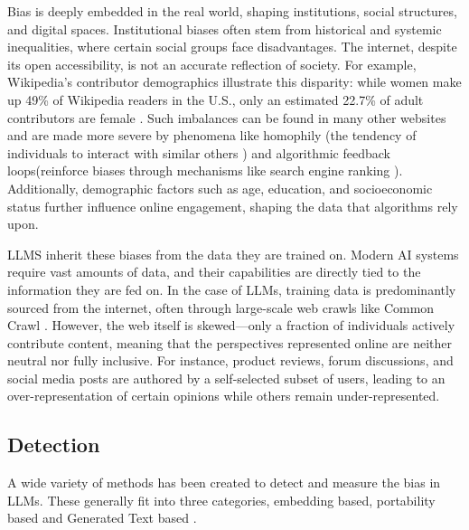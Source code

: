 Bias is deeply embedded in the real world, shaping institutions, social structures, and digital spaces. Institutional biases often stem from historical and systemic inequalities, where certain social groups face disadvantages. The internet, despite its open accessibility, is not an accurate reflection of society. For example, Wikipedia's contributor demographics illustrate this disparity: while women make up 49\% of Wikipedia readers in the U.S., only an estimated 22.7\% of adult contributors are female \citep{hill2013wikipedia}. Such imbalances can be found in many other websites and are made more severe by phenomena like homophily (the tendency of individuals to interact with similar others \citep{karimi2018homophily}) and algorithmic feedback loops(reinforce biases through mechanisms like search engine ranking \citep{lerman2014leveraging}). Additionally, demographic factors such as age, education, and socioeconomic status further influence online engagement, shaping the data that algorithms rely upon.

LLMS inherit these biases from the data they are trained on. Modern AI systems require vast amounts of data, and their capabilities are directly tied to the information they are fed on. In the case of LLMs, training data is predominantly sourced from the internet, often through large-scale web crawls like Common Crawl \citep{brown2020language}. However, the web itself is skewed—only a fraction of individuals actively contribute content, meaning that the perspectives represented online are neither neutral nor fully inclusive. For instance, product reviews, forum discussions, and social media posts are authored by a self-selected subset of users, leading to an over-representation of certain opinions while others remain under-represented.

\subsection{Detection}

A wide variety of methods has been created to detect and measure the bias in LLMs. These generally fit into three categories, embedding based, portability based and Generated Text based \citep{gallegos_bias_2024}.


